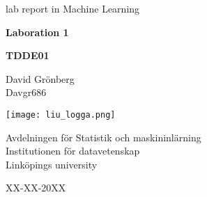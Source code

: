 \documentclass[10pt,swedish, openany]{book}
\begin{document}



\begin{titlepage}
	\clearpage\thispagestyle{empty}
	\centering
	\vspace{2cm}

	{\large lab report in Machine Learning \par}
	\vspace{4cm}
	{\Huge \textbf{Laboration 1}} \\
	\vspace{1cm}
	{\large \textbf{TDDE01} \par}
	\vspace{4cm}
	{\normalsize David Grönberg \\ %
	             Davgr686 \par}
	\vspace{2cm}

    \texttt{[image: liu\_logga.png]}
    
    \vspace{2cm}
    
	{\normalsize Avdelningen för Statistik och maskininlärning \\ 
		Institutionen för datavetenskap \\
		Linköpings university \par}
		
	{\normalsize XX-XX-20XX \par}
	\vspace{2cm}
	
	\pagebreak

\end{titlepage}

\tableofcontents{}

\clearpage

\listoffigures

\clearpage

\listoftables

\mainmatter
\end{document}
